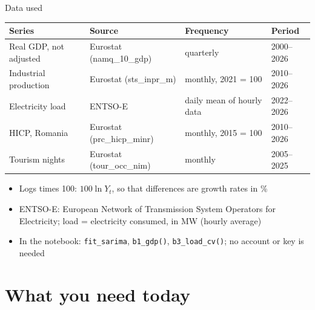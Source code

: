 \begin{frame}{Data used}
\itemsize{\small}
\begin{center}
\footnotesize
\begin{tabular}{llll}
\toprule
\textbf{Series} & \textbf{Source} & \textbf{Frequency} & \textbf{Period} \\
\midrule
Real GDP, not adjusted & Eurostat (namq\_10\_gdp) & quarterly & 2000--2026 \\
Industrial production & Eurostat (sts\_inpr\_m) & monthly, 2021 = 100 & 2010--2026 \\
Electricity load & ENTSO-E & daily mean of hourly data & 2022--2026 \\
HICP, Romania & Eurostat (prc\_hicp\_minr) & monthly, 2015 = 100 & 2010--2026 \\
Tourism nights & Eurostat (tour\_occ\_nim) & monthly & 2005--2025 \\
\bottomrule
\end{tabular}
\end{center}
\begin{itemize}
    \item Logs times 100: $100\ln Y_t$, so that differences are growth rates in \%
    \item ENTSO-E: European Network of Transmission System Operators for Electricity; load = electricity consumed, in MW (hourly average)
    \item In the notebook: \texttt{fit\_sarima}, \texttt{b1\_gdp()}, \texttt{b3\_load\_cv()}; no account or key is needed
\end{itemize}
\end{frame}


\section{What you need today}

